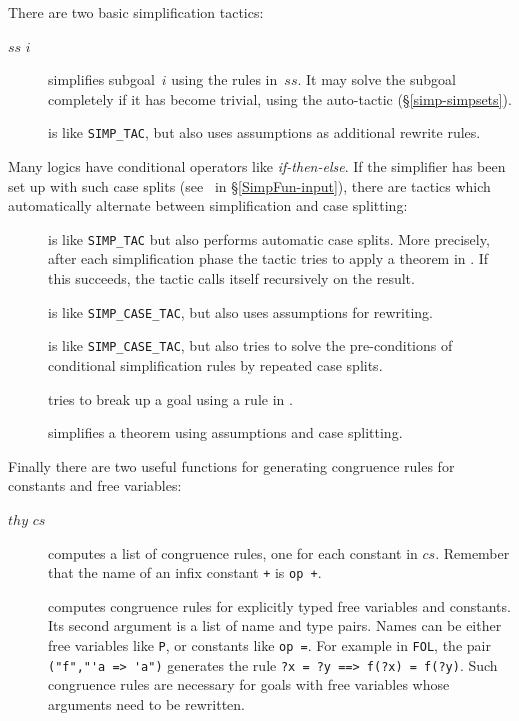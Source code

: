 There are two basic simplification tactics:
\begin{description}
\item[ $ss$ $i$] 
simplifies subgoal~$i$ using the rules in~$ss$.  It may solve the
subgoal completely if it has become trivial, using the auto-tactic
(\S\ref{simp-simpsets}).
  
\item[] 
is like \verb$SIMP_TAC$, but also uses assumptions as additional
rewrite rules.
\end{description}
Many logics have conditional operators like {\it if-then-else}.  If the
simplifier has been set up with such case splits (see~
in \S\ref{SimpFun-input}), there are tactics which automatically alternate
between simplification and case splitting:
\begin{description}
\item[] 
is like {\tt SIMP_TAC} but also performs automatic case splits.
More precisely, after each simplification phase the tactic tries to apply a
theorem in .  If this succeeds, the tactic calls
itself recursively on the result.

\item[] 
is like {\tt SIMP_CASE_TAC}, but also uses assumptions for
rewriting.

\item[] 
is like {\tt SIMP_CASE_TAC}, but also tries to solve the
pre-conditions of conditional simplification rules by repeated case splits.

\item[] 
tries to break up a goal using a rule in
.

\item[] 
simplifies a theorem using assumptions and case splitting.
\end{description}
Finally there are two useful functions for generating congruence
rules for constants and free variables:
\begin{description}
\item[ $thy$ $cs$] 
computes a list of congruence rules, one for each constant in $cs$.
Remember that the name of an infix constant
\verb$+$ is \verb$op +$.

\item[] 
computes congruence rules for explicitly typed free variables and
constants.  Its second argument is a list of name and type pairs.  Names
can be either free variables like {\tt P}, or constants like \verb$op =$.
For example in {\tt FOL}, the pair
\verb$("f","'a => 'a")$ generates the rule \verb$?x = ?y ==> f(?x) = f(?y)$.
Such congruence rules are necessary for goals with free variables whose
arguments need to be rewritten.
\end{description}
